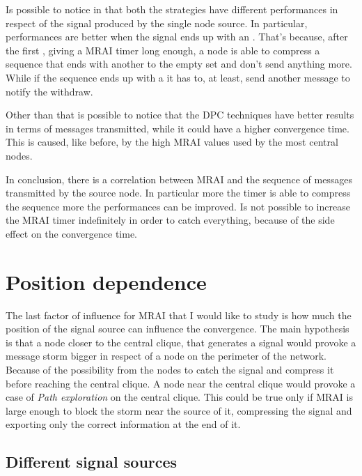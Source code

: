 Is possible to notice in  that
both the strategies have different performances in respect of the signal
produced by the single node source.
In particular, performances are better when the signal ends up with an .
That's because, after the first , giving a \ac{MRAI} timer long enough,
a node is able to compress a sequence that ends with another  to the
empty set and don't send anything more.
While if the sequence ends up with a  it has to, at least, send another
message to notify the withdraw.

Other than that is possible to notice that the \ac{DPC} techniques have better
results in terms of messages transmitted, while it could have a higher
convergence time.
This is caused, like before, by the high \ac{MRAI} values used by the most
central nodes.

In conclusion, there is a correlation between \ac{MRAI} and the sequence of messages
transmitted by the source node.
In particular more the timer is able to compress the sequence more the performances
can be improved.
Is not possible to increase the \ac{MRAI} timer indefinitely in order to catch
everything, because of the side effect on the convergence time.

\section{Position dependence}
\label{sec:position_dependance}

The last factor of influence for \ac{MRAI} that I would like to study is how much
the position of the signal source can influence the convergence.
The main hypothesis is that a node closer to the central clique, that generates
a signal would provoke a message storm bigger in respect of a node on the perimeter
of the network.
Because of the possibility from the nodes to catch the signal and compress it
before reaching the central clique.
A node near the central clique would provoke a case of \textit{Path exploration}
on the central clique.
This could be true only if \ac{MRAI} is large enough to block the storm near the source
of it, compressing the signal and exporting only the correct information at the end of it.

\subsection{Different signal sources}
\label{subsec:different_destinations}

